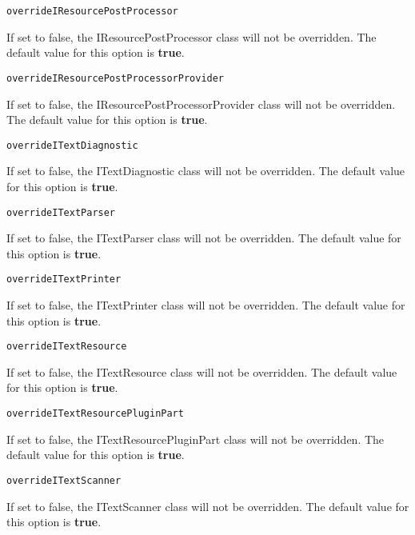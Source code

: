 \noindent\texttt{overrideIResourcePostProcessor}
\begin{myindentpar}{1cm}
If set to false, the IResourcePostProcessor class will not be overridden. The default value for this option is \textbf{true}.
\end{myindentpar}

\noindent\texttt{overrideIResourcePostProcessorProvider}
\begin{myindentpar}{1cm}
If set to false, the IResourcePostProcessorProvider class will not be overridden. The default value for this option is \textbf{true}.
\end{myindentpar}

\noindent\texttt{overrideITextDiagnostic}
\begin{myindentpar}{1cm}
If set to false, the ITextDiagnostic class will not be overridden. The default value for this option is \textbf{true}.
\end{myindentpar}

\noindent\texttt{overrideITextParser}
\begin{myindentpar}{1cm}
If set to false, the ITextParser class will not be overridden. The default value for this option is \textbf{true}.
\end{myindentpar}

\noindent\texttt{overrideITextPrinter}
\begin{myindentpar}{1cm}
If set to false, the ITextPrinter class will not be overridden. The default value for this option is \textbf{true}.
\end{myindentpar}

\noindent\texttt{overrideITextResource}
\begin{myindentpar}{1cm}
If set to false, the ITextResource class will not be overridden. The default value for this option is \textbf{true}.
\end{myindentpar}

\noindent\texttt{overrideITextResourcePluginPart}
\begin{myindentpar}{1cm}
If set to false, the ITextResourcePluginPart class will not be overridden. The default value for this option is \textbf{true}.
\end{myindentpar}

\noindent\texttt{overrideITextScanner}
\begin{myindentpar}{1cm}
If set to false, the ITextScanner class will not be overridden. The default value for this option is \textbf{true}.
\end{myindentpar}

